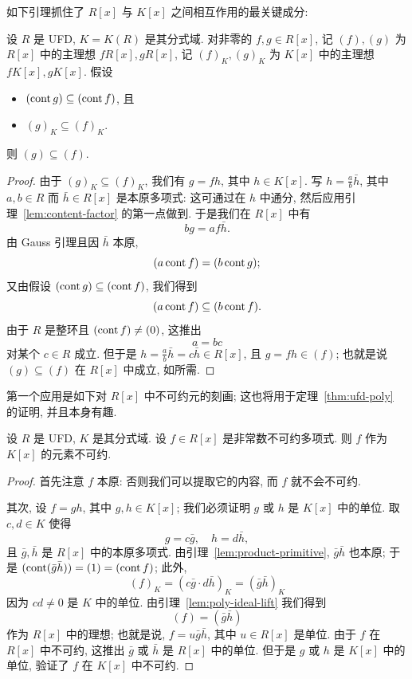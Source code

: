 \noindent 如下引理抓住了 $R[x]$ 与 $K[x]$ 之间相互作用的最关键成分:

\begin{lemma}\label{lem:poly-ideal-lift}
设 $R$ 是 UFD, $K=K(R)$ 是其分式域. 对非零的 $f,g\in R[x]$, 记 $(f),(g)$ 为 $R[x]$ 中的主理想 $fR[x],gR[x]$, 记 $(f)_K,(g)_K$ 为 $K[x]$ 中的主理想 $fK[x],gK[x]$. 假设
\begin{itemize}
\item $(\operatorname{cont} g)\subseteq (\operatorname{cont} f)$, 且
\item $(g)_K\subseteq (f)_K$.
\end{itemize}
则 $(g)\subseteq (f)$.
\end{lemma}

\begin{proof}
由于 $(g)_K\subseteq (f)_K$, 我们有 $g=fh$, 其中 $h\in K[x]$. 写 $h=\frac{a}{b}\bar h$, 其中 $a,b\in R$ 而 $\bar h\in R[x]$ 是本原多项式: 这可通过在 $h$ 中通分, 然后应用引理~\ref{lem:content-factor} 的第一点做到. 于是我们在 $R[x]$ 中有
\[
bg = af\bar h.
\]
由 Gauss 引理且因 $\bar h$ 本原,
\[
(a\operatorname{cont} f) = (b\operatorname{cont} g);
\]
又由假设 $(\operatorname{cont} g)\subseteq (\operatorname{cont} f)$, 我们得到
\[
(a\operatorname{cont} f)\subseteq (b\operatorname{cont} f).
\]
由于 $R$ 是整环且 $(\operatorname{cont} f)\neq (0)$, 这推出
\[
a = bc
\]
对某个 $c\in R$ 成立. 但于是 $h=\frac{a}{b}\bar h=c\bar h\in R[x]$, 且 $g=fh\in (f)$; 也就是说 $(g)\subseteq (f)$ 在 $R[x]$ 中成立, 如所需.
\end{proof}

\noindent 第一个应用是如下对 $R[x]$ 中不可约元的刻画; 这也将用于定理~\ref{thm:ufd-poly} 的证明, 并且本身有趣.

\begin{proposition}\label{prop:irreducible-over-field}
设 $R$ 是 UFD, $K$ 是其分式域. 设 $f\in R[x]$ 是非常数不可约多项式. 则 $f$ 作为 $K[x]$ 的元素不可约.
\end{proposition}

\begin{proof}
首先注意 $f$ 本原: 否则我们可以提取它的内容, 而 $f$ 就不会不可约.

\noindent 其次, 设 $f=gh$, 其中 $g,h\in K[x]$; 我们必须证明 $g$ 或 $h$ 是 $K[x]$ 中的单位. 取 $c,d\in K$ 使得
\[
g = c\bar g,\quad h = d\bar h,
\]
且 $\bar g,\bar h$ 是 $R[x]$ 中的本原多项式. 由引理~\ref{lem:product-primitive}, $\bar g\bar h$ 也本原; 于是 $(\operatorname{cont}(\bar g\bar h))=(1)=(\operatorname{cont} f)$; 此外,
\[
(f)_K = (c\bar g\cdot d\bar h)_K = (\bar g\bar h)_K
\]
因为 $cd\neq 0$ 是 $K$ 中的单位. 由引理~\ref{lem:poly-ideal-lift} 我们得到
\[
(f)=(\bar g\bar h)
\]
作为 $R[x]$ 中的理想; 也就是说, $f=u\bar g\bar h$, 其中 $u\in R[x]$ 是单位. 由于 $f$ 在 $R[x]$ 中不可约, 这推出 $\bar g$ 或 $\bar h$ 是 $R[x]$ 中的单位. 但于是 $g$ 或 $h$ 是 $K[x]$ 中的单位, 验证了 $f$ 在 $K[x]$ 中不可约.
\end{proof}

